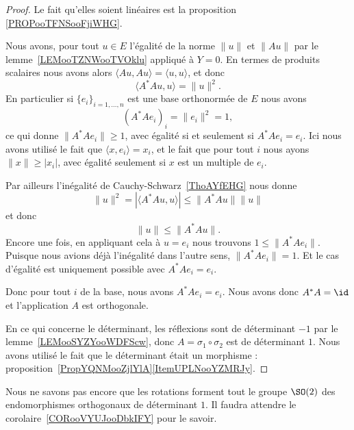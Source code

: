 \begin{proof}
	Le fait qu'elles soient linéaires est la proposition \ref{PROPooTFNSooFjiWHG}.

	Nous avons, pour tout \( u\in E\) l'égalité de la norme \( \| u \|\) et \( \| Au \|\) par le lemme~\ref{LEMooTZNWooTVOklu} appliqué à \( Y=0\). En termes de produits scalaires nous avons alors \( \langle Au, Au\rangle =\langle u, u\rangle \), et donc
	\begin{equation}
		\langle A^*Au, u\rangle =\| u \|^2.
	\end{equation}
	En particulier si \( \{ e_i \}_{i=1,\ldots, n}\) est une base orthonormée de \( E\) nous avons
	\begin{equation}
		(A^*Ae_i)_i=\| e_i \|^2=1,
	\end{equation}
	ce qui donne \( \| A^*Ae_i \|\geq 1\), avec égalité si et seulement si \( A^*Ae_i=e_i\). Ici nous avons utilisé le fait que \( \langle x, e_i\rangle =x_i\), et le fait que pour tout \( i\) nous ayons \( \| x \|\geq | x_i |\), avec égalité seulement si \( x\) est un multiple de \( e_i\).

	Par ailleurs l'inégalité de Cauchy-Schwarz~\ref{ThoAYfEHG} nous donne
	\begin{equation}
		\| u \|^2=| \langle A^*Au, u\rangle  | \leq \| A^*Au \|\| u \|
	\end{equation}
	et donc
	\begin{equation}
		\| u \|\leq \| A^*Au \|.
	\end{equation}
	Encore une fois, en appliquant cela à \( u=e_i\) nous trouvons \( 1\leq \| A^*Ae_i \|\). Puisque nous avions déjà l'inégalité dans l'autre sens, \( \| A^*Ae_i \|=1\). Et le cas d'égalité est uniquement possible avec \( A^*Ae_i=e_i\).

	Donc pour tout \( i\) de la base, nous avons \( A^*Ae_i=e_i\). Nous avons donc \( A^*A=\id\) et l'application \( A\) est orthogonale.

	En ce qui concerne le déterminant, les réflexions sont de déterminant \( -1\) par le lemme~\ref{LEMooSYZYooWDFScw}, donc \( A=\sigma_1\circ\sigma_2\) est de déterminant \( 1\). Nous avons utilisé le fait que le déterminant était un morphisme : proposition~\ref{PropYQNMooZjlYlA}\ref{ItemUPLNooYZMRJy}.
\end{proof}

\begin{remark}
	Nous ne savons pas encore que les rotations forment tout le groupe \( \SO(2)\) des endomorphismes orthogonaux de déterminant \( 1\). Il faudra attendre le corolaire~\ref{CORooVYUJooDbkIFY} pour le savoir.
\end{remark}

